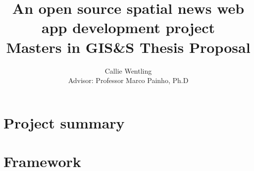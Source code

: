 \documentclass[11pt,usenames,dvipsnames]{article} %
\title{%
	An open source spatial news web app development project \\
	\large Masters in GIS\&S Thesis Proposal\\
}
\author{Callie Wentling\\
	\small Advisor: Professor Marco Painho, Ph.D}
\date{} %
\begin{document}

\maketitle
\thispagestyle{empty} %

\vspace*{\fill}
\section*{Project summary}


\newpage
\thispagestyle{empty} %
{\small
\tableofcontents
}

{\small
\listoffigures
}

{\small
\listoftables
}

\newpage
{}
\section{Framework}  \label{sec:framework}

\end{document}
